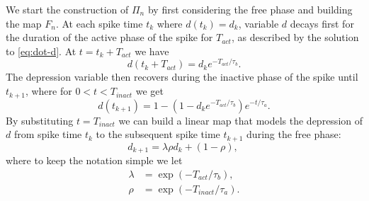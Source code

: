 \documentclass[../manuscript.tex]{subfiles}
\begin{document}
We start the construction of $\Pi_n$ by first considering the free phase and building the map $F_n$.
At each spike time $t_{k}$ where $d(t_k) = d_k$, variable $d$ decays first for the duration of the active phase of the spike for $T_{act}$, as described by the solution to \cref{eq:dot-d}.
At $t = t_k + T_{act}$ we have
\begin{equation}
  d(t_k + T_{act}) = d_k e^{-T_{act}/\tau_b}.
\end{equation}
The depression variable then recovers during the inactive phase of the spike until $t_{k+1}$, where for $0<t<T_{inact}$ we get
\begin{equation}
  d(t_{k+1}) = 1 - (1 - d_k e^{-T_{act}/\tau_b} )e^{-t/\tau_a}.
\end{equation}
By substituting $t=T_{inact}$ we can build a linear map that models the depression of $d$ from spike time $t_{k}$ to the subsequent spike time $t_{k+1}$ during the free phase:
\begin{equation}
  d_{k+1} = \lambda\rho d_{k} + (1-\rho),~\label{eq:map-d}
\end{equation}
where to keep the notation simple we let
\begin{align}
  \lambda & = \exp(-T_{act}/\tau_b),    \\
  \rho    & =\exp(-T_{inact}/\tau_{a}).
\end{align}
\end{document}

